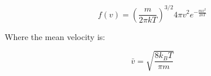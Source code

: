 \begin{equation}
	f(v) = \left(\frac{m}{2 \pi k T}\right)^{3/2}4 \pi v^2 e^{-\frac{m v^2}{2 k T}} \label{eq: mb_distribution}
\end{equation}

Where the mean velocity is:

\begin{equation}
	\bar{v} = \sqrt{\frac{8 k_B T}{\pi m}} \label{eq: mb_mean}
\end{equation}